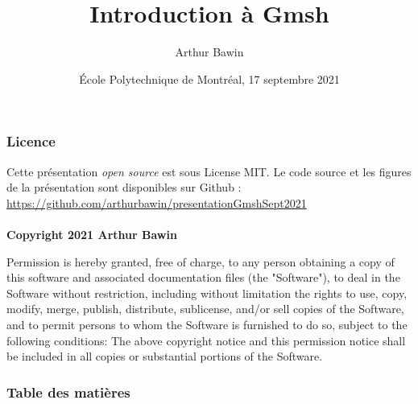 \documentclass[aspectratio=169]{beamer}
\begin{document}

\title[Introduction à Gmsh]
{Introduction à Gmsh}

\subtitle{}

\author[Arthur Bawin]
{Arthur Bawin}


\date[EPM 2021] %
{École Polytechnique de Montréal, 17 septembre 2021}

\frame{\titlepage}

\begin{frame}
\frametitle{Licence}
Cette présentation \textit{open source} est sous License MIT. Le code source et les figures de la présentation sont disponibles sur Github : \url{https://github.com/arthurbawin/presentationGmshSept2021} \\
~\\
\textbf{ Copyright 2021 Arthur Bawin}

\footnotesize{Permission is hereby granted, free of charge, to any person obtaining a copy of this software and associated documentation files (the "Software"), to deal in the Software without restriction, including without limitation the rights to use, copy, modify, merge, publish, distribute, sublicense, and/or sell copies of the Software, and to permit persons to whom the Software is furnished to do so, subject to the following conditions:
The above copyright notice and this permission notice shall be included in all copies or substantial portions of the Software.}
\end{frame}

\begin{frame}
\frametitle{Table des matières}
\tableofcontents
\end{frame}
\end{document}
